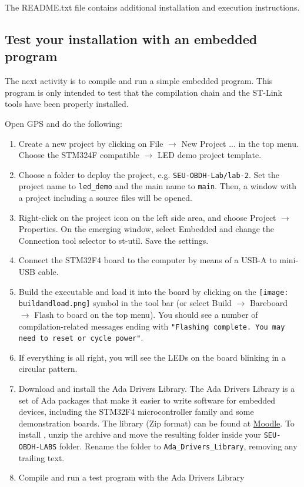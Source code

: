 The README.txt file contains additional installation and execution instructions.

\subsection{Test your installation with an embedded program}

The next activity is to compile and run a simple embedded program.
This program is only intended to test that the compilation chain
and the ST-Link tools have been properly installed.

Open GPS and do the following:
\begin{enumerate}
\item Create a new project by clicking on File $\rightarrow$ New Project ... in the top menu. Choose the STM324F compatible $\rightarrow$ LED demo project template.

\item	Choose a folder to deploy the project, e.g. \textcolor{mPurple}{\texttt{SEU-OBDH-Lab/lab-2}}.
Set the project name to \texttt{led\_demo} and the main name to \texttt{main}.
Then, a window with a project including a source files will be opened.

\item	Right-click on the project icon on the left side area,
and choose Project $\rightarrow$ Properties.
On the emerging window,
select Embedded and change the Connection tool selector to st-util.
Save the settings.

\item	Connect the STM32F4 board to the computer by means of a USB-A to mini-USB cable.

\item	Build the executable and load it into the board by clicking on the
\hbox{\texttt{[image: buildandload.png]}} symbol in the tool bar (or select Build $\rightarrow$ Bareboard $\rightarrow$ Flash to board on the top menu). You should see a number of compilation-related messages ending with \texttt{"Flashing complete. You may need to reset or cycle power"}.

\item	If everything is all right, you will see the LEDs on the board blinking in a circular pattern.

\item Download and install the Ada Drivers Library. The Ada Drivers Library is a set of Ada packages that make it easier to write software for embedded devices, including the STM32F4 microcontroller family and some demonstration boards. The library (Zip format) can be found at \href{https://moodle.upm.es/titulaciones/oficiales/mod/resource/view.php?id=245313}{Moodle}. To install , unzip the archive and move the resulting folder inside your \textcolor{mPurple}{\texttt{SEU-OBDH-LABS}} folder. Rename the folder to \textcolor{mPurple}{\texttt{Ada\_Drivers\_Library}}, removing any trailing text.

\item Compile and run a test program with the Ada Drivers Library
\end{enumerate}
